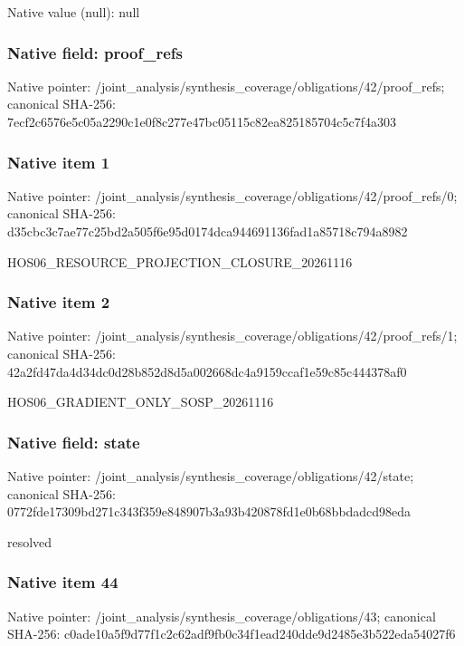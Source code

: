 \documentclass[10pt,a4paper]{article}
\begin{document}
Native value (null): null

\subsubsection{Native field: proof\_\allowbreak{}refs}
Native pointer: /joint\_\allowbreak{}analysis/synthesis\_\allowbreak{}coverage/obligations/42/proof\_\allowbreak{}refs; canonical SHA-256: 7ecf2c6576e5c05a2290c1e0f8c277e47bc05115c82ea825185704c5c7f4a303

\subsubsection{Native item 1}
Native pointer: /joint\_\allowbreak{}analysis/synthesis\_\allowbreak{}coverage/obligations/42/proof\_\allowbreak{}refs/0; canonical SHA-256: d35cbc3c7ae77c25bd2a505f6e95d0174dca944691136fad1a85718c794a8982

\begingroup\raggedright\sloppy HOS06\_\allowbreak{}RESOURCE\_\allowbreak{}PROJECTION\_\allowbreak{}CLOSURE\_\allowbreak{}20261116\par\endgroup

\subsubsection{Native item 2}
Native pointer: /joint\_\allowbreak{}analysis/synthesis\_\allowbreak{}coverage/obligations/42/proof\_\allowbreak{}refs/1; canonical SHA-256: 42a2fd47da4d34dc0d28b852d8d5a002668dc4a9159ccaf1e59c85c444378af0

\begingroup\raggedright\sloppy HOS06\_\allowbreak{}GRADIENT\_\allowbreak{}ONLY\_\allowbreak{}SOSP\_\allowbreak{}20261116\par\endgroup

\subsubsection{Native field: state}
Native pointer: /joint\_\allowbreak{}analysis/synthesis\_\allowbreak{}coverage/obligations/42/state; canonical SHA-256: 0772fde17309bd271c343f359e848907b3a93b420878fd1e0b68bbdadcd98eda

\begingroup\raggedright\sloppy resolved\par\endgroup

\subsubsection{Native item 44}
Native pointer: /joint\_\allowbreak{}analysis/synthesis\_\allowbreak{}coverage/obligations/43; canonical SHA-256: c0ade10a5f9d77f1c2c62adf9fb0c34f1ead240dde9d2485e3b522eda54027f6
\end{document}
